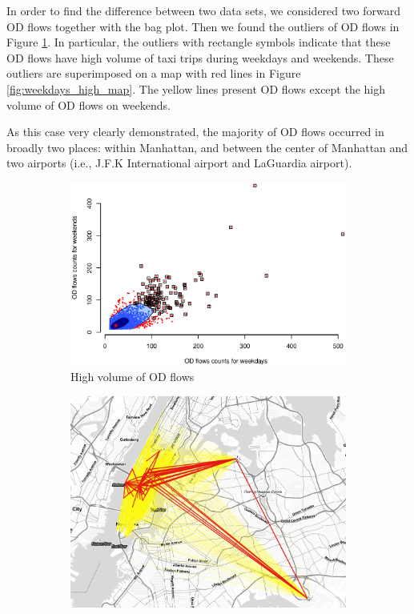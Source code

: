 \documentclass[a4paper,UKenglish]{lipics-v2016}
\begin{document}
In order to find the difference between two data sets, we considered two forward OD flows together with the bag plot. Then we found the outliers of OD flows in Figure \ref{fig:weekdays_high}. In particular, the outliers with rectangle symbols indicate that these OD flows have high volume of taxi trips during weekdays and weekends. These outliers are superimposed on a map with red lines in Figure \ref{fig:weekdays_high_map}. The yellow lines present OD flows except the high volume of OD flows on weekends. 

As this case very clearly demonstrated, the majority of OD flows occurred in broadly two places: within Manhattan, and between the center of Manhattan and two airports (i.e., J.F.K International airport and LaGuardia airport).  


\begin{figure}
	\centering
	\begin{subfigure}[b]{0.49\textwidth}
		\includegraphics[width=\textwidth]{images/Outliers_high_weekdays_weekends.eps}
		\caption{High volume of OD flows}
		\label{fig:weekdays_high}
	\end{subfigure}
	\hfill %
	\begin{subfigure}[b]{0.49\textwidth}
		\includegraphics[width=\textwidth]{images/outliers2_high_weekdays_weekends.png}

\end{subfigure}
\end{figure}
\end{document}
